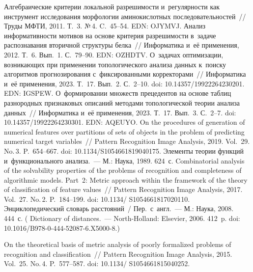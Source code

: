 \begin{multicols}{2}
{\small\frenchspacing
 { %
 \begin{thebibliography}{9}
 Алгебраические критерии локальной 
разрешимости и~регулярности как инструмент исследования морфологии аминокислотных последовательностей~// Труды 
\mbox{МФТИ}, 2011. Т.~3. №\,4. C.~45--54. EDN: OJYMVJ.
 Анализ информативности мотивов на основе критерия 
разрешимости в~задаче распознавания вторичной структуры белка~// Информатика и~её 
применения, 2012. Т.~6. Вып.~1. С.~79--90. EDN: OZHDTV.
 О~задачах оптимизации, воз\-ни\-ка\-ющих при применении 
топологического анализа данных к~поиску алгоритмов прогнозирования с~фиксированными 
корректорами~// Информатика и~её применения, 2023. Т.~17. Вып.~2. С.~2--10. doi: 
10.14357/19922264230201. EDN: IGSPEW.
 О~формировании множеств прецедентов на основе таблиц разнородных 
признаковых описаний методами топологической теории анализа данных~// Информатика 
и~её применения, 2023. Т.~17. Вып.~3. С.~2--7. doi: 10.14357/19922264230301. EDN: 
AQEUYO.
 On the procedures of generation of numerical features over 
partitions of sets of objects in the problem of predicting numerical target variables~// Pattern 
Recognition Image Analysis, 2019. Vol.~29. No.\,3. P.~654--667. doi: 
10.1134/S1054661819040175.
 Элементы теории функций и~функционального 
анализа.~--- М.: Наука, 1989. 624~с.
 Combinatorial analysis of the solvability properties of the 
problems of recognition and completeness of algorithmic models. Part~2: Metric approach within 
the framework of the theory of classification of feature values~// Pattern Recognition Image Analysis, 
2017. Vol.~27. No.\,2. P.~184--199.  doi: 10.1134/ S1054661817020110.
 Энциклопедический словарь расстояний~/
Пер.\ с~англ.~--- М.: Наука, 2008.  444~с. ( {Dictionary of distances}.~---  
North-Holland: Elsevier, 2006. 412~p. doi: 10.1016/B978-0-444-52087-6.X5000-8.)

 On the theoretical basis of metric analysis of poorly 
formalized problems of recognition and classification~// Pattern Recognition Image Analysis, 2015. 
Vol.~25. No.\,4. P.~577--587. doi: 10.1134/ S1054661815040252.
\end{thebibliography}

 }
 }

\end{multicols}

